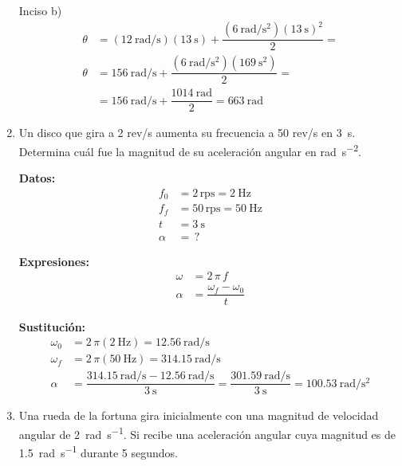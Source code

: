 \documentclass[14pt]{extarticle}
\begin{document}
\begin{enumerate}
Inciso b)
\begin{align*}
\theta &= \left( \SI[per-mode=fraction]{12}{\radian\per\second} \right) \left( \SI{13}{\second} \right) + \dfrac{ \displaystyle \left( \SI[per-mode=fraction]{6}{\radian\per\square\second} \right) \left( \SI{13}{\second} \right)^{2}}{2} = \\[0.5em]
\theta &= \SI[per-mode=fraction]{156}{\radian\per\second} + \dfrac{\displaystyle \left( \SI[per-mode=fraction]{6}{\radian\per\square\second} \right) \left( \SI{169}{\square\second} \right)}{2} = \\[0.5em]
&= \SI[per-mode=fraction]{156}{\radian\per\second} + \dfrac{\SI{1014}{\radian}}{2} = \SI{663}{\radian}
\end{align*}

\item Un disco que gira a \num{2}  rev/s aumenta su frecuencia a \num{50} rev/s en \SI{3}{\second}. Determina cuál fue la magnitud de su aceleración angular en \unit{\radian\per\square\second}.

\begin{minipage}[t]{0.4\linewidth}
\textbf{Datos:}
\begin{align*}
f_{0} &= 2 \, \text{rps} = \SI{2}{\hertz} \\
f_{f} &= 50 \, \text{rps} = \SI{50}{\hertz}\\
t &= \SI{3}{\second} \\
\alpha &= \, ?
\end{align*}
\end{minipage}
\begin{minipage}[t]{0.4\linewidth}
\textbf{Expresiones:}
\begin{align*}
\omega &= 2 \, \pi \, f \\
\alpha &= \dfrac{\omega_{f} - \omega_{0}}{t}
\end{align*}
\end{minipage}

\textbf{Sustitución:}
\begin{align*}
\omega_{0} &= 2 \, \pi (\SI{2}{\hertz}) = \SI[per-mode=fraction]{12.56}{\radian\per\second} \\[0.5em]
\omega_{f} &= 2 \, \pi (\SI{50}{\hertz}) = \SI[per-mode=fraction]{314.15}{\radian\per\second} \\[0.5em]
\alpha &= \dfrac{\displaystyle \SI[per-mode=fraction]{314.15}{\radian\per\second} - \SI[per-mode=fraction]{12.56}{\radian\per\second}}{\SI{3}{\second}} = \dfrac{\displaystyle \SI[per-mode=fraction]{301.59}{\radian\per\second}}{\SI{3}{\second}} = \SI[per-mode=fraction]{100.53}{\radian\per\square\second}
\end{align*}
\item Una rueda de la fortuna gira inicialmente con una magnitud de velocidad angular de \SI{2}{\radian\per\second}. Si recibe una aceleración angular cuya magnitud es de \SI{1.5}{\radian\per\second} durante \num{5} segundos.


\end{enumerate}
\end{document}
